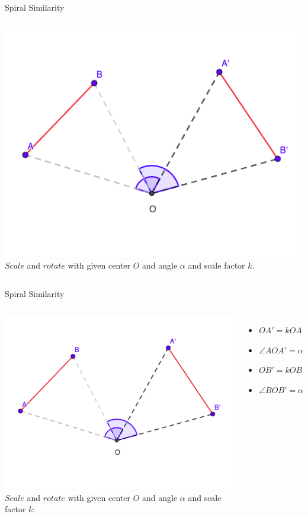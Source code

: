\documentclass{beamer}
\begin{document}
\begin{frame}{Spiral Similarity}
	\begin{columns}
		\includegraphics[scale=0.34]{spi1.png}
		$Scale$ and $rotate$ with given center $O$ and angle
		$\alpha$ and scale factor $k$.
	\end{columns}
\end{frame}
\begin{frame}{Spiral Similarity}
	\begin{columns}
		\column{0.6\textwidth}
		\includegraphics[scale=0.34]{spi1.png}
		\column{0.4\textwidth}
		$Scale$ and $rotate$ with given center $O$ and angle
		$\alpha$ and scale factor $k$:
		\begin{itemize}
			\item $OA' = kOA$
			\item $\angle AOA' = \alpha$
			\item $OB' = kOB$
			\item $\angle BOB' = \alpha$
		\end{itemize}
	\end{columns}
\end{frame}
\end{document}
